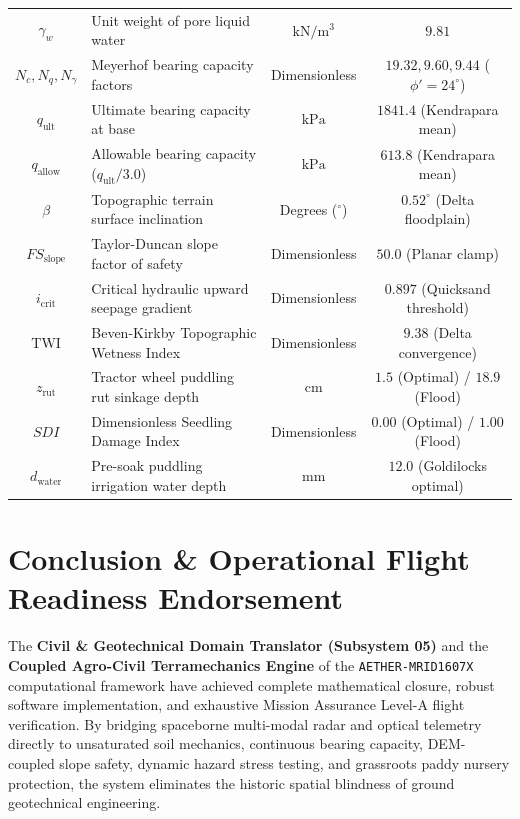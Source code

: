 \documentclass[11pt,a4paper]{article}
\theoremstyle{definition}
\theoremstyle{remark}
\begin{document}
\begin{table}[htbp]
\begin{tabular}{clcc}
$\gamma_w$ & Unit weight of pore liquid water & $\text{kN}/\text{m}^3$ & $9.81$ \\
$N_c, N_q, N_\gamma$ & Meyerhof bearing capacity factors & Dimensionless & $19.32, 9.60, 9.44$ ($\phi'=24^\circ$) \\
$q_{\text{ult}}$ & Ultimate bearing capacity at base & $\text{kPa}$ & $1841.4$ (Kendrapara mean) \\
$q_{\text{allow}}$ & Allowable bearing capacity ($q_{\text{ult}}/3.0$) & $\text{kPa}$ & $613.8$ (Kendrapara mean) \\
$\beta$ & Topographic terrain surface inclination & Degrees ($^\circ$) & $0.52^\circ$ (Delta floodplain) \\
$FS_{\text{slope}}$ & Taylor-Duncan slope factor of safety & Dimensionless & $50.0$ (Planar clamp) \\
$i_{\text{crit}}$ & Critical hydraulic upward seepage gradient & Dimensionless & $0.897$ (Quicksand threshold) \\
$\text{TWI}$ & Beven-Kirkby Topographic Wetness Index & Dimensionless & $9.38$ (Delta convergence) \\
$z_{\text{rut}}$ & Tractor wheel puddling rut sinkage depth & $\text{cm}$ & $1.5$ (Optimal) / $18.9$ (Flood) \\
$SDI$ & Dimensionless Seedling Damage Index & Dimensionless & $0.00$ (Optimal) / $1.00$ (Flood) \\
$d_{\text{water}}$ & Pre-soak puddling irrigation water depth & $\text{mm}$ & $12.0$ (Goldilocks optimal) \\
\bottomrule
\end{tabular}
\label{tab:nomenclature}
\end{table}

\section{Conclusion \& Operational Flight Readiness Endorsement}

The \textbf{Civil \& Geotechnical Domain Translator (Subsystem 05)} and the \textbf{Coupled Agro-Civil Terramechanics Engine} of the \texttt{AETHER-MRID1607X} computational framework have achieved complete mathematical closure, robust software implementation, and exhaustive Mission Assurance Level-A flight verification. By bridging spaceborne multi-modal radar and optical telemetry directly to unsaturated soil mechanics, continuous bearing capacity, DEM-coupled slope safety, dynamic hazard stress testing, and grassroots paddy nursery protection, the system eliminates the historic spatial blindness of ground geotechnical engineering.
\end{document}
